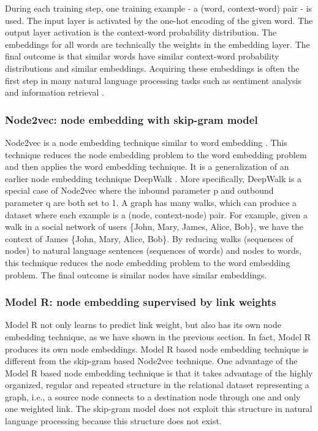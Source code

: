 \documentclass{article} %
\begin{document}
During each training step, one training example - a (word, context-word) pair - is used.
The input layer is activated by the one-hot encoding of the given word.
The output layer activation is the context-word probability distribution.
The embeddings for all words are technically the weights in the embedding layer.
The final outcome is that similar words have similar context-word probability distributions and similar embeddings.
Acquiring these embeddings is often the first step in many natural language processing tasks such as sentiment analysis \citep{socher2013recursive} and
information retrieval \citep{shen2014latent}.

\subsubsection{Node2vec: node embedding with skip-gram model}
Node2vec is a node embedding technique similar to word embedding \citep{grover2016node2vec}.
This technique reduces the node embedding problem to the word embedding problem and then applies the word embedding technique.
It is a generalization of an earlier node embedding technique DeepWalk \citep{perozzi2014deepwalk}.
More specifically, DeepWalk is a special case of Node2vec where the inbound parameter p and outbound parameter q are both set to 1.
A graph has many walks, which can produce a dataset where each example is a (node, context-node) pair.
For example, given a walk in a social network of users \{John, Mary, James, Alice, Bob\}, we have the context of James \{John, Mary, Alice, Bob\}.
By reducing walks (sequences of nodes) to natural language sentences (sequences of words) and nodes to words,
this technique reduces the node embedding problem to the word embedding problem.
The final outcome is similar nodes have similar embeddings.

\subsubsection{Model R: node embedding supervised by link weights}
Model R not only learns to predict link weight,
but also has its own node embedding technique,
as we have shown in the previous section.
In fact, Model R produces its own node embeddings.
Model R based node embedding technique is different from the skip-gram based Node2vec technique.
One advantage of the Model R based node embedding technique is that it takes advantage of the highly organized, regular and repeated structure in the relational dataset representing a graph, i.e., a source node connects to a destination node through one and only one weighted link.
The skip-gram model does not exploit this structure in natural language processing because this structure does not exist.
\end{document}
